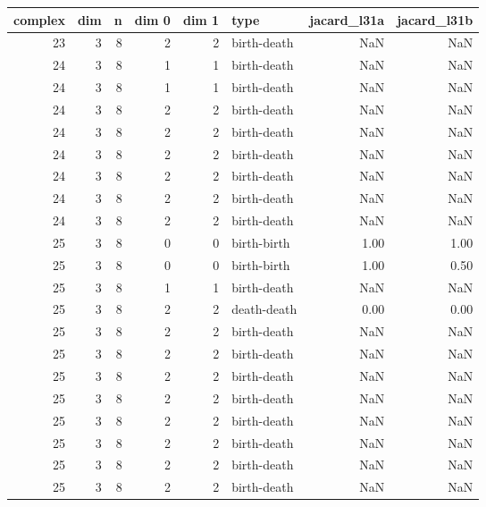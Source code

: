 \documentclass{article}
\begin{document}
\begin{center}
\begin{tabular}{rrrrrlrr}
\toprule
complex & dim & n & dim 0 & dim 1 & type & jacard\_l31a & jacard\_l31b \\
\midrule
23 & 3 & 8 & 2 & 2 & birth-death & NaN & NaN \\
24 & 3 & 8 & 1 & 1 & birth-death & NaN & NaN \\
24 & 3 & 8 & 1 & 1 & birth-death & NaN & NaN \\
24 & 3 & 8 & 2 & 2 & birth-death & NaN & NaN \\
24 & 3 & 8 & 2 & 2 & birth-death & NaN & NaN \\
24 & 3 & 8 & 2 & 2 & birth-death & NaN & NaN \\
24 & 3 & 8 & 2 & 2 & birth-death & NaN & NaN \\
24 & 3 & 8 & 2 & 2 & birth-death & NaN & NaN \\
24 & 3 & 8 & 2 & 2 & birth-death & NaN & NaN \\
25 & 3 & 8 & 0 & 0 & birth-birth & 1.00 & 1.00 \\
25 & 3 & 8 & 0 & 0 & birth-birth & 1.00 & 0.50 \\
25 & 3 & 8 & 1 & 1 & birth-death & NaN & NaN \\
25 & 3 & 8 & 2 & 2 & death-death & 0.00 & 0.00 \\
25 & 3 & 8 & 2 & 2 & birth-death & NaN & NaN \\
25 & 3 & 8 & 2 & 2 & birth-death & NaN & NaN \\
25 & 3 & 8 & 2 & 2 & birth-death & NaN & NaN \\
25 & 3 & 8 & 2 & 2 & birth-death & NaN & NaN \\
25 & 3 & 8 & 2 & 2 & birth-death & NaN & NaN \\
25 & 3 & 8 & 2 & 2 & birth-death & NaN & NaN \\
25 & 3 & 8 & 2 & 2 & birth-death & NaN & NaN \\
25 & 3 & 8 & 2 & 2 & birth-death & NaN & NaN \\
\bottomrule
\end{tabular}
\end{center}
\end{document}
